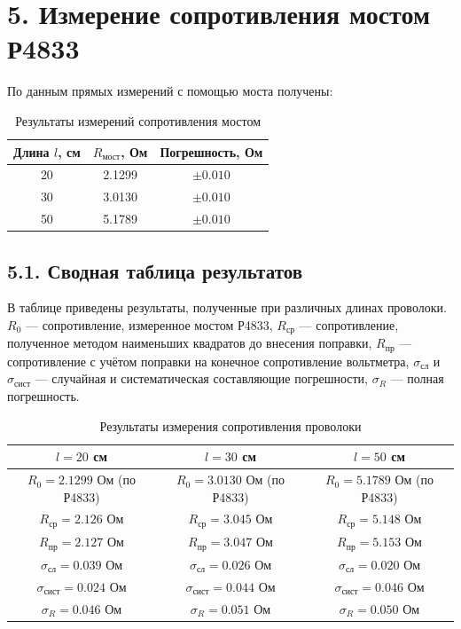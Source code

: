 \documentclass[12pt,a4paper]{article}
\begin{document}
\section*{5. Измерение сопротивления мостом Р4833}

По данным прямых измерений с помощью моста получены:

\begin{table}[H]
\centering
\caption{Результаты измерений сопротивления мостом}
\label{tab:bridge}
\begin{tabular}{c|c|c}
\toprule
Длина $l$, см & $R_{\text{мост}}$, Ом & Погрешность, Ом\\
\midrule
20 & 2.1299 & $\pm0.010$\\
30 & 3.0130 & $\pm0.010$\\
50 & 5.1789 & $\pm0.010$\\
\bottomrule
\end{tabular}
\end{table}


\subsection*{5.1. Сводная таблица результатов}

В таблице приведены результаты, полученные при различных длинах
проволоки. $R_0$ --- сопротивление, измеренное мостом Р4833,
$R_{\text{ср}}$ --- сопротивление, полученное методом наименьших
квадратов до внесения поправки, $R_{\text{пр}}$ --- сопротивление
с учётом поправки на конечное сопротивление вольтметра,
$\sigma_{\text{сл}}$ и $\sigma_{\text{сист}}$ --- случайная и
систематическая составляющие погрешности, $\sigma_R$ --- полная
погрешность.

\begin{table}[H]
\centering
\caption{Результаты измерения сопротивления проволоки}
\label{tab:summary}
\begin{tabular}{|c|c|c|}
\hline
$l=20$ см & $l=30$ см & $l=50$ см \\
\hline
\makecell{$R_0=2.1299$ Ом \\ (по Р4833)} &
\makecell{$R_0=3.0130$ Ом \\ (по Р4833)} &
\makecell{$R_0=5.1789$ Ом \\ (по Р4833)} \\
\hline
$R_{\text{ср}}=2.126$ Ом & $R_{\text{ср}}=3.045$ Ом & $R_{\text{ср}}=5.148$ Ом \\
\hline
$R_{\text{пр}}=2.127$ Ом & $R_{\text{пр}}=3.047$ Ом & $R_{\text{пр}}=5.153$ Ом \\
\hline
$\sigma_{\text{сл}}=0.039$ Ом & $\sigma_{\text{сл}}=0.026$ Ом & $\sigma_{\text{сл}}=0.020$ Ом \\
\hline
$\sigma_{\text{сист}}=0.024$ Ом & $\sigma_{\text{сист}}=0.044$ Ом & $\sigma_{\text{сист}}=0.046$ Ом \\
\hline
$\sigma_R=0.046$ Ом & $\sigma_R=0.051$ Ом & $\sigma_R=0.050$ Ом \\
\hline
\end{tabular}
\end{table}
\end{document}
